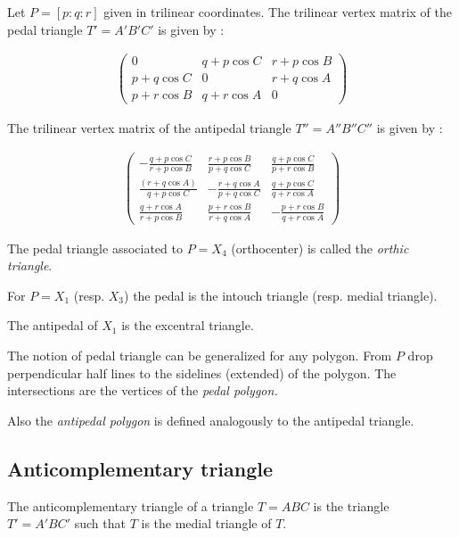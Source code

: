 Let $P=[p:q:r]$ given in trilinear coordinates. The trilinear vertex matrix of the pedal triangle $T'=A'B'C'$ is given by \cite{mw}:

\begin{align*}
   \left(\begin{matrix} 0& q+p\cos C& r+p\cos B\\
   p+q\cos C &0 & r+q\cos A\\
   p+r\cos B & q+r\cos A &0\end{matrix}\right)
\end{align*}


The trilinear vertex matrix of the antipedal triangle $T''=A''B''C''$ is given by \cite{mw}:
 
\begin{align*}
   \left(\begin{matrix} - \frac{ q + p \cos C}{r + p \cos B}& \frac{r + p \cos B}{p + q \cos C}& \frac{q + p \cos C}{p + r \cos B}\\
    \frac{ (r + q \cos A)}{q + p \cos C}& -\frac{r + q \cos A}{p + q \cos  C}& \frac{q + p \cos C}{q + r \cos A}\\
   \frac{q + r \cos A}{r + p \cos B}&\frac{ p + r \cos B}{r + q \cos A} & - \frac{p + r \cos B}{q + r \cos A}\end{matrix}\right)
\end{align*}

 The pedal triangle associated to  $P=X_4$ (orthocenter) is called the {\em orthic triangle}.
 
 For $P=X_1$ (resp. $X_3$) the pedal is the intouch triangle (resp. medial triangle). 
 
 The antipedal of $X_1$ is the excentral triangle.

The notion of pedal triangle  can be generalized for any polygon. From $P$ drop perpendicular half lines to the sidelines (extended) of the polygon. The intersections are the vertices of the {\em pedal polygon.}

Also the {\em  antipedal polygon} is defined analogously to the antipedal triangle.
 
 \subsection{ Anticomplementary triangle}
 
 The anticomplementary triangle of a triangle $T=ABC$ is the triangle $T'=A'BC'$ such that $T$ is the medial triangle of $T$.
 
